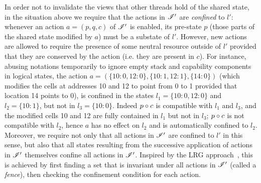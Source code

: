 In order not to invalidate the views that other threads hold of the
shared state, in the situation above we require that the actions in
$\mathscr{I}'$ are \emph{confined} to $l'$: whenever an action $a = (p, q, c)$ of
$\mathscr{I}'$ is enabled, its pre-state $p$ (those parts of the shared state modified by $a$) must be a substate of $l'$. However, new actions are allowed to
require the presence of some neutral resource outside of $l'$ provided that they are conserved by the action (i.e. they are present in $c$).
%
For instance, abusing notations temporarily to ignore empty stack and
capability components in logical states, the action $a = (\{10:0, 12:0\}, \{10:1, 12:1\}, \{14:0\})$ (which modifies the cells at addresses 10 and 12 to point from 0 to 1 provided that location 14 points to 0), is
confined in the states $l_1=\{10:0,12:0\}$ and $l_2=\{10:1\}$, but not in
$l_3=\{10:0\}$. Indeed $p \circ c$ is compatible with $l_1$ and $l_3$, and the
modified cells 10 and 12 are fully contained in $l_1$ but not in
$l_3$; $p \circ c$ is not compatible with $l_2$, hence $a$ has no effect on
$l_2$ and is automatically confined to $l_2$.
%
Moreover, we require not only that all actions in $\mathscr{I}'$
are confined to $l'$ in this sense, but also that all states resulting
from the successive application of actions in $\mathscr{I}'$ themselves confine
all actions in $\mathscr{I}'$. Inspired by the LRG approach~\cite{lrg}, this is achieved by first finding a set that
is invariant under all actions in $\mathscr{I}'$ (called a \emph{fence}),
then checking the confinement condition for each action.

